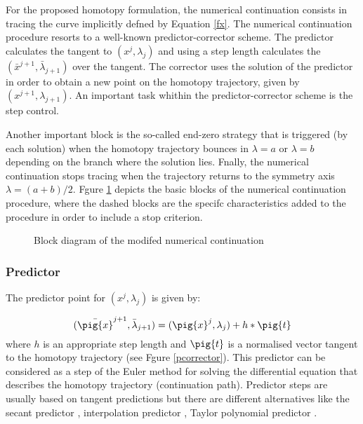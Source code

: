 \documentclass[conference]{IEEEtran}
\begin{document}
For the proposed homotopy formulation, the numerical continuation consists in tracing the curve implicitly defned by Equation \ref{fx}.
The numerical continuation procedure resorts to a well-known predictor-corrector scheme.
The predictor  calculates the tangent to
$(x^j,\lambda_j)$ and using a step length calculates the $(\bar{x}^{j+1},\bar{\lambda}_{j+1})$
over the tangent. The corrector uses the solution of the predictor in order to obtain
a new point on the homotopy trajectory, given by  $(x^{j+1},\lambda_{j+1})$.
An important task whithin the predictor-corrector scheme is the step control.\par
Another important block is the so-called end-zero strategy that is 
triggered (by each solution) when the homotopy trajectory bounces in $\lambda=a$ or $\lambda=b$
depending on the branch where the solution lies.
Fnally, the numerical continuation stops tracing when the trajectory returns to the symmetry axis
$\lambda=(a+b)/2$.
Fgure \ref{bloques} depicts the basic blocks of the numerical continuation procedure, where the dashed blocks
are the specifc characteristics added to the procedure in order to include a stop criterion. 




\begin{figure}[h]
\centerline{
\epsfxsize=54mm
}
\caption{Block diagram of the modifed numerical continuation}
\label{bloques}
\end{figure}



\subsubsection{Predictor}

The predictor point for $(x^j,\lambda_j)$ is given by:

\begin{displaymath}
(\bar{\pig{x}}^{j+1},\bar{\lambda}_{j+1})=(\pig{x}^j,\lambda_j)+h*\pig{t}
\end{displaymath}
where $h$ is an appropriate step length and $\pig{t}$ is a normalised vector tangent to the
homotopy trajectory (see Fgure \ref{pcorrector}). This predictor can be considered as a step of the Euler
method for solving the differential equation that describes the homotopy trajectory (continuation path). 
Predictor steps are usually based on tangent predictions but there are
different alternatives like the secant predictor \cite{homo_seydel}, interpolation predictor
\cite{homo_allgower}, Taylor polynomial predictor \cite{homo_allgower}. 
\end{document}
